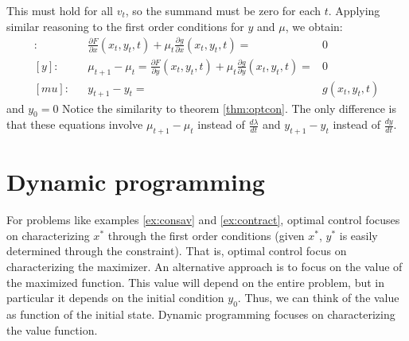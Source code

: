 \documentclass[12pt,reqno]{amsart}
\theoremstyle{definition}
\begin{document}
This must hold for all $v_t$, so the summand must be zero for each
$t$. Applying similar reasoning to the first order conditions for $y$
and $\mu$, we obtain:
\begin{align*}
  [x]:&& \frac{\partial F}{\partial x}(x_t,y_t,t)  + \mu_t \frac{\partial
    g}{\partial x}(x_t,y_t,t) = &  0 \\
  [y]: && \mu_{t+1}-\mu_t = \frac{\partial F}{\partial
    y}(x_t,y_t,t)  + \mu_t \frac{\partial 
    g}{\partial y}(x_t,y_t,t) = &  0 \\
  [mu]:&& y_{t+1} - y_t = & g(x_t,y_t,t) 
\end{align*}
and $y_0 = 0$
Notice the similarity to theorem \ref{thm:optcon}. The only difference 
is that these equations involve $\mu_{t+1} - \mu_t$ instead of
$\frac{d\lambda}{dt}$ and $y_{t+1}-y_t$ instead of $\frac{dy}{dt}$. 

\section{Dynamic programming}

For problems like examples \ref{ex:consav} and \ref{ex:contract},
optimal control focuses on characterizing $x^*$ through the first
order conditions (given $x^*$, $y^*$ is easily determined through the
constraint). That is, optimal control focus on characterizing the maximizer. An
alternative approach is to focus on the value of the maximized
function. This value will depend on the entire problem, but in
particular it depends on the initial condition $y_0$. Thus, we can
think of the value as function of the initial state. Dynamic
programming focuses on characterizing the value function.  
\end{document}
